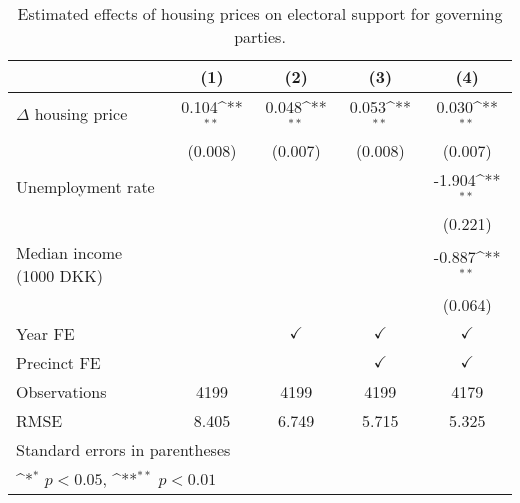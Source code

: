 \begin{table}[htbp]\centering
\def\sym#1{\ifmmode^{#1}\else\(^{#1}\)\fi}
\caption{Estimated effects of housing prices on electoral support for governing parties.} \label{predv}
\begin{tabular}{l*{4}{c}}
\hline\hline
                    &\multicolumn{1}{c}{(1)}        &\multicolumn{1}{c}{(2)}        &\multicolumn{1}{c}{(3)}        &\multicolumn{1}{c}{(4)}        \\
\hline
$\Delta$ housing price&       0.104\sym{**}&       0.048\sym{**}&       0.053\sym{**}&       0.030\sym{**}\\
                    &     (0.008)        &     (0.007)        &     (0.008)        &     (0.007)        \\
[1em]
Unemployment rate   &                    &                    &                    &      -1.904\sym{**}\\
                    &                    &                    &                    &     (0.221)        \\
[1em]
Median income (1000 DKK)&                    &                    &                    &      -0.887\sym{**}\\
                    &                    &                    &                    &     (0.064)        \\
[1em]
\hline Year FE      &                    &$\checkmark$        &$\checkmark$        &$\checkmark$        \\
[1em]
Precinct FE         &                    &                    &$\checkmark$        &$\checkmark$        \\
\hline
Observations        &        4199        &        4199        &        4199        &        4179        \\
RMSE                &       8.405        &       6.749        &       5.715        &       5.325        \\
\hline\hline
\multicolumn{5}{l}{\footnotesize Standard errors in parentheses}\\
\multicolumn{5}{l}{\footnotesize \sym{*} \(p<0.05\), \sym{**} \(p<0.01\)}\\
\end{tabular}
\end{table}
